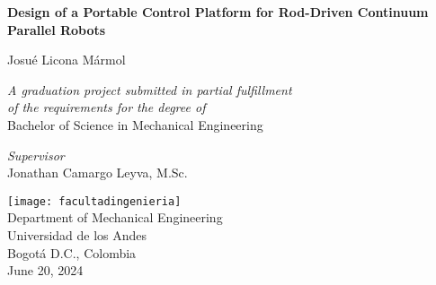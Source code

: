 \begin{titlepage}
    \hypertarget{titlepage}{} %
    \begin{center}
        \vspace*{1.5cm}

        \LARGE
        \textbf{Design of a Portable Control Platform for Rod-Driven Continuum Parallel Robots}

        \vspace{2cm}
        \Large
        Josué Licona Mármol

        \large
        \vspace{1.5cm}
        \textit{A graduation project submitted in partial fulfillment \\
        of the requirements for the degree of} \\
        \vspace{0.5cm}
        Bachelor of Science in Mechanical Engineering

        \vspace{1.5cm}
        \textit{Supervisor} \\
        Jonathan Camargo Leyva, M.Sc.

        \vspace{2cm}
        \texttt{[image: facultadingenieria]}
        \vspace{1cm}
        \\
        Department of Mechanical Engineering\\
        Universidad de los Andes\\
        Bogotá D.C., Colombia\\
        June 20, 2024
    \end{center}
\end{titlepage}

\normalsize